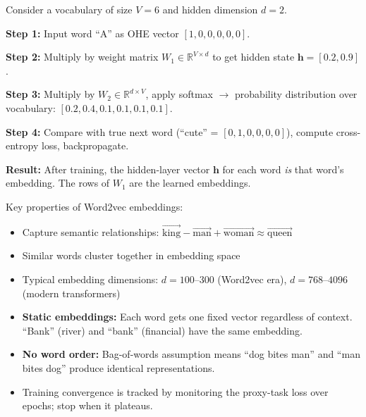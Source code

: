 \documentclass[11pt, a4paper]{article}
\begin{document}
\begin{exbox}
Consider a vocabulary of size $V=6$ and hidden dimension $d=2$.

\textbf{Step 1:} Input word ``A'' as OHE vector $[1,0,0,0,0,0]$.

\textbf{Step 2:} Multiply by weight matrix $W_1 \in \mathbb{R}^{V \times d}$ to get hidden state $\mathbf{h} = [0.2, 0.9]$.

\textbf{Step 3:} Multiply by $W_2 \in \mathbb{R}^{d \times V}$, apply softmax $\to$ probability distribution over vocabulary: $[0.2, 0.4, 0.1, 0.1, 0.1, 0.1]$.

\textbf{Step 4:} Compare with true next word (``cute'' = $[0,1,0,0,0,0]$), compute cross-entropy loss, backpropagate.

\textbf{Result:} After training, the hidden-layer vector $\mathbf{h}$ for each word \emph{is} that word's embedding. The rows of $W_1$ are the learned embeddings.
\end{exbox}

Key properties of Word2vec embeddings:
\begin{itemize}[leftmargin=2em]
  \item Capture semantic relationships: $\vec{\text{king}} - \vec{\text{man}} + \vec{\text{woman}} \approx \vec{\text{queen}}$
  \item Similar words cluster together in embedding space
  \item Typical embedding dimensions: $d = 100$--$300$ (Word2vec era), $d = 768$--$4096$ (modern transformers)
\end{itemize}

\begin{warnbox}
\begin{itemize}[leftmargin=1.5em]
  \item \textbf{Static embeddings:} Each word gets one fixed vector regardless of context. ``Bank'' (river) and ``bank'' (financial) have the same embedding.
  \item \textbf{No word order:} Bag-of-words assumption means ``dog bites man'' and ``man bites dog'' produce identical representations.
  \item Training convergence is tracked by monitoring the proxy-task loss over epochs; stop when it plateaus.
\end{itemize}
\end{warnbox}

\end{document}
